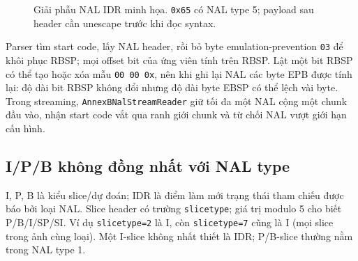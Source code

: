 \documentclass[11pt,a4paper]{article}
\renewcommand{\_}{\origunderscore\allowbreak}
\begin{document}
\begin{figure}[H]\centering
{}
\caption{Giải phẫu NAL IDR minh họa. \texttt{0x65} có NAL type 5; payload sau header cần unescape trước khi đọc syntax.}
\label{fig:nal-format}
\end{figure}
Parser tìm start code, lấy NAL header, rồi bỏ byte emulation-prevention \texttt{03} để khôi phục RBSP; mọi offset bit của ứng viên tính trên RBSP. Lật một bit RBSP có thể tạo hoặc xóa mẫu \texttt{00 00 0x}, nên khi ghi lại NAL các byte EPB được tính lại: độ dài bit RBSP không đổi nhưng độ dài byte EBSP có thể lệch vài byte. Trong streaming, \texttt{AnnexBNalStreamReader} giữ tối đa một NAL cộng một chunk đầu vào, nhận start code vắt qua ranh giới chunk và từ chối NAL vượt giới hạn cấu hình.

\subsection{I/P/B không đồng nhất với NAL type}
I, P, B là kiểu slice/dự đoán; IDR là điểm làm mới trạng thái tham chiếu được báo bởi loại NAL. Slice header có trường \texttt{slice\_type}; giá trị modulo 5 cho biết P/B/I/SP/SI. Ví dụ \texttt{slice\_type=2} là I, còn \texttt{slice\_type=7} cũng là I (mọi slice trong ảnh cùng loại). Một I-slice không nhất thiết là IDR; P/B-slice thường nằm trong NAL type 1.
\end{document}
